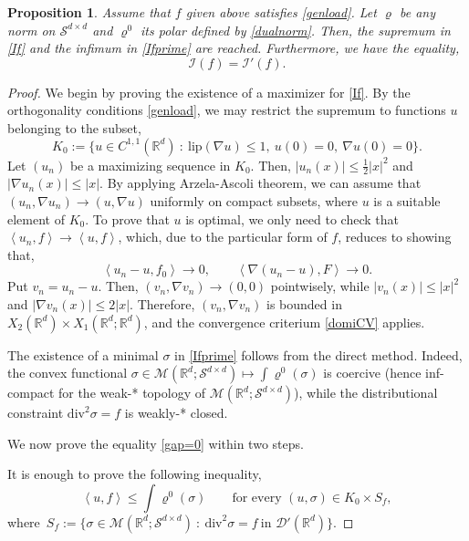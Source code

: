 \documentclass[11pt,letterpaper,reqno]{amsart}
\newtheorem{proposition}[theorem]{Proposition}
\theoremstyle{definition}
\numberwithin{equation}{section}
\newcommand{\R}{\mathbb{R}}
\newcommand{\Rd}{\R^d}
\newcommand{\Mes}{{\mathcal{M}}}
\newcommand{\dive}{{\mathrm{div}}}
\newcommand{\pairing}[1]{{\left \langle #1 \right \rangle}}
\newcommand{\Lip}{{\mathrm{lip}}}
\newcommand{\I}{\mathcal{I}}
\newcommand{\D}{\mathcal{D}}
\newcommand{\Sf}{{{S}_f}}
\newcommand{\Sdd}{{\mathcal{S}^{d \times d}}}
\begin{document}
\begin{proposition}\label{nogap-classic} Assume that $f$ given  above satisfies \eqref{genload}. Let $\varrho$ be any norm on $\Sdd$ 
and $\varrho^0$ its polar defined by \eqref{dualnorm}. Then,  the supremum in \eqref{If} and the infimum in \eqref{Ifprime} are reached. 
Furthermore, we have the equality,
\begin{equation} \label{gap=0}
\I(f) =  \I'(f).
\end{equation}


\end{proposition}
\begin{proof}  We begin by proving the existence of a maximizer for \eqref{If}.  By the orthogonality conditions \eqref{genload}, we may restrict the supremum to functions $u$ belonging to the subset,
$$  K_0:= \Big\{u\in C^{1,1}(\R^d) \ : \ \Lip(\nabla u)\le 1,\ u(0)=0,\ \nabla u(0)=0 \Big\}.$$
Let $(u_n)$ be  a maximizing sequence in $K_0$. Then, $|u_n(x)| \le \frac1{2} |x|^2$ and  $|\nabla u_n(x)|\le |x|$.
By applying Arzela-Ascoli  theorem, we can assume that
$(u_n,\nabla u_n) \to (u,\nabla u)$ uniformly on compact subsets, where $u$ is a suitable element of $K_0$. 
To prove that $u$ is optimal, we only need to check that  $\pairing{u_n,f} \to \pairing{u,f}$, which, due to the particular form of $f$,   reduces to showing that,
$$  \pairing{u_n-u,f_0} \to 0, \qquad \pairing{\nabla (u_n-u),F} \to 0.$$
Put $v_n = u_n-u$. Then,  $(v_n,\nabla v_n)\to (0,0)$ pointwisely, while $|v_n(x)| \le |x|^2$ and $|\nabla v_n(x)|\le 2  |x|$.
 Therefore, $(v_n,\nabla v_n)$ is bounded in  $X_2(\R^d)\times X_1(\R^d;\Rd)$, and the convergence criterium \eqref{domiCV} applies.

  The existence of a minimal $\sigma$ in \eqref{Ifprime} follows from the direct method. Indeed,  the convex functional 
 $\sigma \in \Mes(\R^d;\Sdd) \mapsto  \int \varrho^0(\sigma)$  is coercive (hence inf-compact for the weak-* topology of $\Mes(\R^d;\Sdd)$),  while  the distributional constraint $\dive^2\sigma=f$ is weakly-* closed.
 
 We now prove the equality \eqref{gap=0} within two steps.
 
 \noindent {\bf Step 1:   $\I(f)\le \I'(f).$}  It is enough to prove  the following inequality,
 \begin{equation}\label{inf>sup}
 \pairing{u,f}   \le  \int \varrho^0(\sigma) \qquad\text{for every $(u,\sigma)\in K_0\times \Sf$},
\end{equation}
 where\   $\Sf:=\big\{\sigma \in \Mes(\R^d;\Sdd)\ :\ \dive^2 \sigma = f \ \text{in $\D'(\R^d)$}\big\}.$
 

\end{proof}
\end{document}

